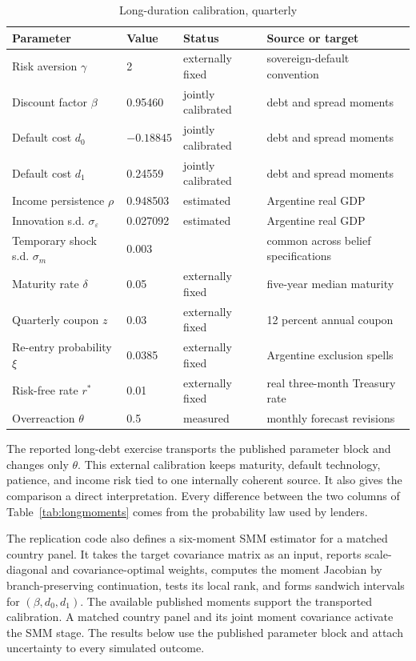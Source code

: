 \documentclass[11pt]{article}
\theoremstyle{definition}
\begin{document}
\begin{table}[t]
\centering
\caption{Long-duration calibration, quarterly}
\label{tab:longcalibration}
\footnotesize
\setlength{\tabcolsep}{4pt}
\begin{tabular}{p{3.1cm}p{1.4cm}p{3.0cm}p{5.1cm}}
\toprule
Parameter & Value & Status & Source or target \\
\midrule
Risk aversion $\gamma$ & 2 & externally fixed & sovereign-default convention \\
Discount factor $\beta$ & 0.95460 & jointly calibrated & debt and spread moments \\
Default cost $d_0$ & $-0.18845$ & jointly calibrated & debt and spread moments \\
Default cost $d_1$ & 0.24559 & jointly calibrated & debt and spread moments \\
Income persistence $\rho$ & 0.948503 & estimated & Argentine real GDP \\
Innovation s.d. $\sigma_\varepsilon$ & 0.027092 & estimated & Argentine real GDP \\
Temporary shock s.d. $\sigma_m$ & 0.003 & \citet{ChatterjeeEyigungor2012} & common across belief specifications \\
Maturity rate $\delta$ & 0.05 & externally fixed & five-year median maturity \\
Quarterly coupon $z$ & 0.03 & externally fixed & 12 percent annual coupon \\
Re-entry probability $\xi$ & 0.0385 & externally fixed & Argentine exclusion spells \\
Risk-free rate $r^*$ & 0.01 & externally fixed & real three-month Treasury rate \\
Overreaction $\theta$ & 0.5 & measured & monthly forecast revisions \\
\bottomrule
\end{tabular}
\end{table}

The reported long-debt exercise transports the published parameter block and changes only $\theta$. This external calibration keeps maturity, default technology, patience, and income risk tied to one internally coherent source. It also gives the comparison a direct interpretation. Every difference between the two columns of Table~\ref{tab:longmoments} comes from the probability law used by lenders.

The replication code also defines a six-moment SMM estimator for a matched country panel. It takes the target covariance matrix as an input, reports scale-diagonal and covariance-optimal weights, computes the moment Jacobian by branch-preserving continuation, tests its local rank, and forms sandwich intervals for $(\beta,d_0,d_1)$. The available published moments support the transported calibration. A matched country panel and its joint moment covariance activate the SMM stage. The results below use the published parameter block and attach uncertainty to every simulated outcome.
\end{document}
